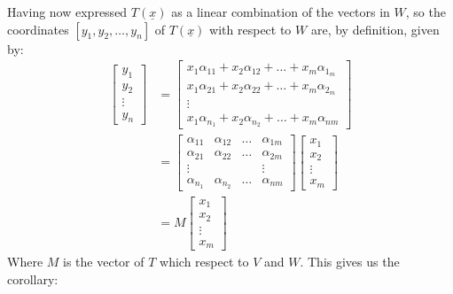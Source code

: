 \documentclass[a4paper]{article}
\theoremstyle{plain}
\theoremstyle{definition}
\theoremstyle{remark}
\begin{document}
Having now expressed $T(\underline{x})$ as a linear combination of the vectors in $W$, so the coordinates $[y_1,y_2,\ldots,y_n]$ of $T(\underline{x})$ with respect to $W$ are, by definition, given by:
\begin{align*}
	\begin{bmatrix} y_1 \\ y_2 \\ \vdots \\ y_n \end{bmatrix}  &= \begin{bmatrix} x_1\alpha_{11} + x_2\alpha_{12}+\ldots+x_m\alpha_1_m \\
x_1\alpha_{21}+x_2\alpha_{22}+\ldots+x_m\alpha_2_m \\
\vdots \\
x_1\alpha_n_1 + x_2\alpha_n_2 + \ldots + x_m \alpha_{nm}\end{bmatrix}  \\
&=\begin{bmatrix} \alpha_{11} & \alpha_{12} & \ldots &\alpha_{1m} \\
\alpha_{21} & \alpha_{22} & \ldots & \alpha_{2m}\\
	\vdots & & & \vdots \\
	\alpha_n_1 & \alpha_n_2 & \ldots & \alpha_{nm}\end{bmatrix} \begin{bmatrix} x_1 \\ x_2 \\ \vdots \\ x_m \end{bmatrix}  \\
		   &= M \begin{bmatrix} x_1 \\ x_2 \\ \vdots \\ x_m \end{bmatrix} 
\end{align*}
Where $M$ is the vector of $T$ which respect to $V$ and $W$. This gives us the corollary:
\end{document}
